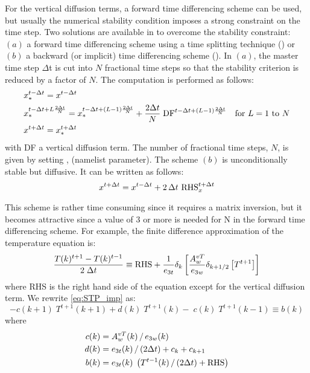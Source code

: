 \documentclass[../tex_main/NEMO_manual]{subfiles}
\begin{document}
For the vertical diffusion terms, a forward time differencing scheme can be 
used, but usually the numerical stability condition imposes a strong 
constraint on the time step. Two solutions are available in \NEMO to overcome 
the stability constraint: $(a)$ a forward time differencing scheme using a 
time splitting technique () or $(b)$ a backward (or implicit) 
time differencing scheme (). In $(a)$, the master 
time step $\Delta $t is cut into $N$ fractional time steps so that the 
stability criterion is reduced by a factor of $N$. The computation is performed as 
follows:
\begin{equation} \label{eq:STP_ts}
\begin{split}
& x_\ast ^{t-\Delta t} = x^{t-\Delta t}   \\
& x_\ast ^{t-\Delta t+L\frac{2\Delta t}{N}}=x_\ast ^{t-\Delta t+\left( {L-1} 
\right)\frac{2\Delta t}{N}}+\frac{2\Delta t}{N}\;\text{DF}^{t-\Delta t+\left( {L-1} \right)\frac{2\Delta t}{N}}
        \quad \text{for $L=1$ to $N$}      \\
& x^{t+\Delta t} = x_\ast^{t+\Delta t}
\end{split}
\end{equation}
with DF a vertical diffusion term. The number of fractional time steps, $N$, is given 
by setting , (namelist parameter). The scheme $(b)$ is unconditionally 
stable but diffusive. It can be written as follows:
\begin{equation} \label{eq:STP_imp}
   x^{t+\Delta t} = x^{t-\Delta t} + 2 \, \Delta t \  \text{RHS}_x^{t+\Delta t}
\end{equation} 


This scheme is rather time consuming since it requires a matrix inversion, 
but it becomes attractive since a value of 3 or more is needed for N in
the forward time differencing scheme. For example, the finite difference 
approximation of the temperature equation is:
\begin{equation} \label{eq:STP_imp_zdf}
\frac{T(k)^{t+1}-T(k)^{t-1}}{2\;\Delta t}\equiv \text{RHS}+\frac{1}{e_{3t} }\delta 
_k \left[ {\frac{A_w^{vT} }{e_{3w} }\delta _{k+1/2} \left[ {T^{t+1}} \right]} 
\right]
\end{equation}
where RHS is the right hand side of the equation except for the vertical diffusion term. 
We rewrite \autoref{eq:STP_imp} as:
\begin{equation} \label{eq:STP_imp_mat}
-c(k+1)\;T^{t+1}(k+1) + d(k)\;T^{t+1}(k) - \;c(k)\;T^{t+1}(k-1) \equiv b(k)
\end{equation}
where 
\begin{align*} 
 c(k) &= A_w^{vT} (k) \, / \, e_{3w} (k)     \\
 d(k) &= e_{3t} (k)       \, / \, (2\Delta t) + c_k + c_{k+1}    \\
 b(k) &= e_{3t} (k) \; \left( T^{t-1}(k) \, / \, (2\Delta t) + \text{RHS} \right)    
\end{align*}
\end{document}
